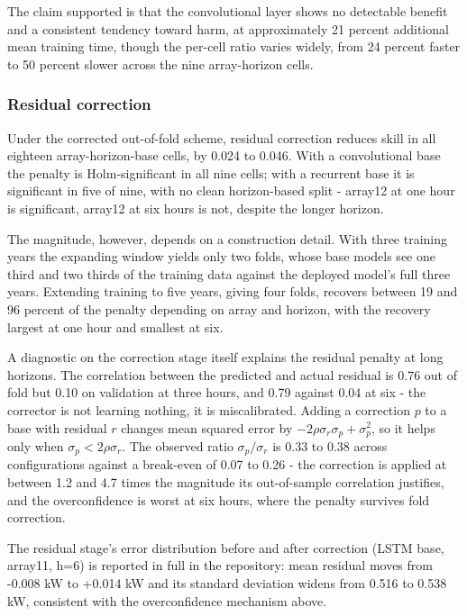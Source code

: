 The claim supported is that the convolutional layer shows no detectable
benefit and a consistent tendency toward harm, at approximately 21
percent additional mean training time, though the per-cell ratio varies
widely, from 24 percent faster to 50 percent slower across the nine
array-horizon cells.

\subsubsection{Residual correction}

Under the corrected out-of-fold scheme, residual correction reduces
skill in all eighteen array-horizon-base cells, by 0.024 to 0.046. With
a convolutional base the penalty is Holm-significant in all nine cells;
with a recurrent base it is significant in five of nine, with no clean
horizon-based split - array12 at one hour is significant, array12 at
six hours is not, despite the longer horizon.

The magnitude, however, depends on a construction detail. With three
training years the expanding window yields only two folds, whose base
models see one third and two thirds of the training data against the
deployed model's full three years. Extending training to five years,
giving four folds, recovers between 19 and 96 percent of the penalty
depending on array and horizon, with the recovery largest at one hour
and smallest at six.

A diagnostic on the correction stage itself explains the residual
penalty at long horizons. The correlation between the predicted and
actual residual is 0.76 out of fold but 0.10 on validation at three
hours, and 0.79 against 0.04 at six - the corrector is not learning
nothing, it is miscalibrated. Adding a correction $p$ to a base with
residual $r$ changes mean squared error by $-2\rho\sigma_r\sigma_p +
\sigma_p^2$, so it helps only when $\sigma_p < 2\rho\sigma_r$. The observed
ratio $\sigma_p / \sigma_r$ is 0.33 to 0.38 across configurations against a
break-even of 0.07 to 0.26 - the correction is applied at between 1.2
and 4.7 times the magnitude its out-of-sample correlation justifies, and
the overconfidence is worst at six hours, where the penalty survives
fold correction.

The residual stage's error distribution before and after correction
(LSTM base, array11, h=6) is reported in full in the repository: mean
residual moves from -0.008 kW to +0.014 kW and its standard deviation
widens from 0.516 to 0.538 kW, consistent with the overconfidence
mechanism above.

